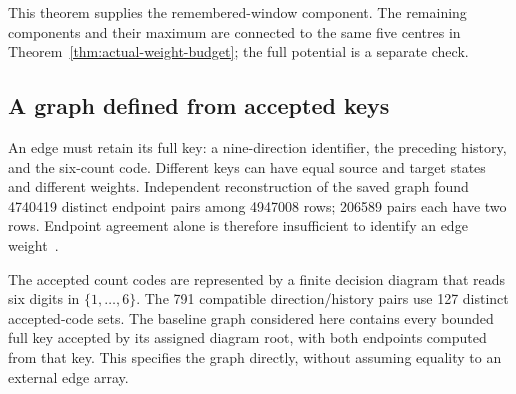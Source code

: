 \documentclass[11pt,a4paper]{article}
\theoremstyle{definition}
\theoremstyle{remark}
\begin{document}
This theorem supplies the remembered-window component. The remaining
components and their maximum are connected to the same five centres in
Theorem~\ref{thm:actual-weight-budget}; the full potential is a separate check.

\subsection{A graph defined from accepted keys}\label{sec:defined-graph}
An edge must retain its full key: a nine-direction identifier, the preceding
history, and the six-count code. Different keys can have equal source and
target states and different weights. Independent reconstruction of the saved
graph found 4740419 distinct endpoint pairs among 4947008 rows; 206589 pairs
each have two rows. Endpoint agreement alone is therefore insufficient to
identify an edge weight~\cite{graphcoveragearchive}.

The accepted count codes are represented by a finite decision diagram that
reads six digits in $\{1,\ldots,6\}$. The 791 compatible direction/history
pairs use 127 distinct accepted-code sets. The baseline graph considered here contains
every bounded full key accepted by its assigned diagram root, with both
endpoints computed from that key. This specifies the graph directly, without
assuming equality to an external edge array.
\end{document}
